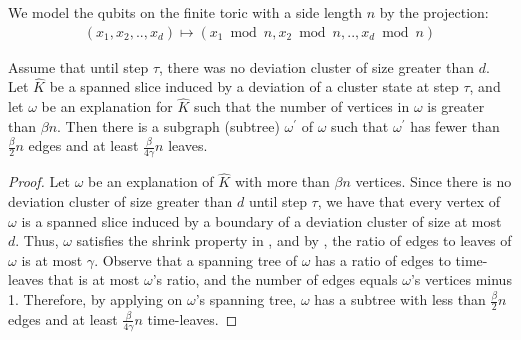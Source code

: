 
\begin{definition}
We model the qubits on the finite toric with a side length $n$ by the projection:
  \begin{equation*}
    \begin{split}
      (x_{1}, x_{2}, .., x_{d}) \mapsto (x_{1}\bmod n, x_{2}\bmod n, .., x_{d}\bmod n) 
    \end{split}
  \end{equation*}
\end{definition}


\begin{claim}
Assume that until step $\tau$, there was no deviation cluster of size greater than $d$. Let $\hat{K}$ be a spanned slice induced by a deviation of a cluster state at step $\tau$, and let $\omega$ be an explanation for $\hat{K}$ such that the number of vertices in $\omega$ is greater than $\beta n$. Then there is a subgraph (subtree) $\omega^{\prime}$ of $\omega$ such that $\omega^{\prime}$ has fewer than $\frac{\beta}{2}n$ edges and at least $\frac{\beta}{4\gamma} n$ leaves.
\end{claim}


\begin{proof}
Let $\omega$ be an explanation of $\hat{K}$ with more than $\beta n$ vertices. Since there is no deviation cluster of size greater than $d$ until step $\tau$, we have that every vertex of $\omega$ is a spanned slice induced by a boundary of a deviation cluster of size at most $d$. Thus, $\omega$ satisfies the shrink property in , and by , the ratio of edges to leaves of $\omega$ is at most $\gamma$.
Observe that a spanning tree of $\omega$ has a ratio of edges to time-leaves that is at most $\omega$'s ratio, and the number of edges equals $\omega$'s vertices minus 1. Therefore, by applying  on $\omega$'s spanning tree, $\omega$ has a subtree with less than $\frac{\beta}{2}n$ edges and at least $\frac{\beta}{4\gamma} n$ time-leaves. 
  \end{proof}

